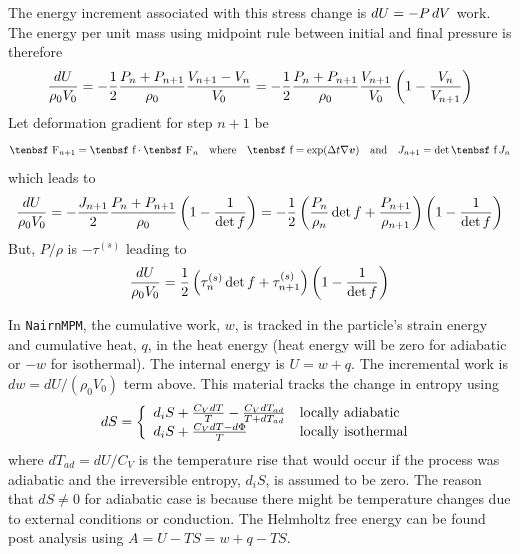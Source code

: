 \documentclass[11pt]{book}
\renewcommand{\vec}[1]{\boldsymbol{#1}}
\def\f{\hbox{\tenbsf f}}
\def\F{\hbox{\tenbsf F}}
\begin{document}
The energy increment associated with this stress change is $dU = -P\thinspace dV$ work. The energy per unit mass using midpoint rule between initial and final pressure is therefore
\begin{equation}
    {dU\over \rho_0 V_0} = - {1\over2} {P_n+P_{n+1}\over \rho_0} 
         {V_{n+1} - V_n\over V_0} = - {1\over2} {P_n+P_{n+1}\over \rho_0} {V_{n+1}\over V_0}
         \left(1 - {V_n\over V_{n+1}}\right)
\end{equation}
Let deformation gradient for step $n+1$ be
\begin{equation}
       \F_{n+1} = \f\cdot\F_n  \quad{\rm where}\quad \f = \exp(\Delta t\nabla\vec v)
       \quad{\rm and}\quad J_{n+1} = \det \f \thinspace J_n
\end{equation}
which leads to
\begin{equation}
    {dU\over \rho_0 V_0} = - {J_{n+1}\over2} {P_n+P_{n+1}\over \rho_0} 
         \left(1 - {1\over\det f}\right) = - {1\over2}
         \left({P_n\over \rho_{n}}\det f+{P_{n+1}\over \rho_{n+1}} \right)
         \left(1 - {1\over\det f}\right)
\end{equation}
But, $P/\rho$ is $-\tau^{(s)}$ leading to
\begin{equation}
    {dU\over \rho_0 V_0} =  {1\over2}
         \left(\tau_n^{(s)}\det f+\tau_{n+1}^{(s)} \right)
         \left(1 - {1\over\det f}\right)
\end{equation}

In {\tt NairnMPM}, the cumulative work, $w$, is tracked in the particle's strain energy and cumulative heat, $q$, in the heat energy (heat energy will be zero for adiabatic or $-w$  for isothermal). The internal energy is $U = w + q$. The incremental work is $dw = dU/(\rho_0 V_0)$ term above. This material tracks the change in entropy using
\begin{equation}
      dS =\left\{ \begin{array}{ll}
                d_iS + {C_V dT\over T} - {C_V dT_{ad}\over T + dT_{ad}} & {\rm locally\ adiabatic} \\
                d_iS + {C_V dT-d\Phi\over T} & {\rm locally\ isothermal}
                \end{array} \right. \\
\end{equation}
where $dT_{ad} = dU/C_V$ is the temperature rise that would occur if the process was adiabatic and the irreversible entropy, $d_iS$, is assumed to be zero. The reason that $dS\ne0$ for adiabatic case is because there might be temperature changes due to external conditions or conduction. The Helmholtz free energy can be found post analysis using $A = U - TS = w + q - TS$.
\end{document}
